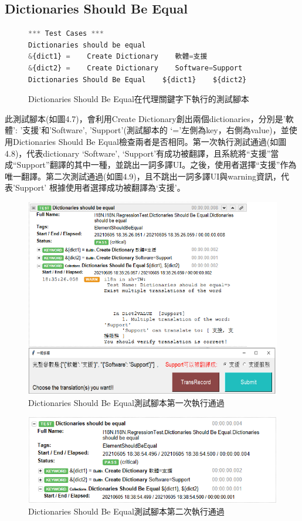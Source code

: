 \subsection{Dictionaries Should Be Equal}
\begin{figure}[H]
\begin{lstlisting}[language={python}]
*** Test Cases ***
Dictionaries should be equal
&{dict1} =    Create Dictionary    軟體=支援
&{dict2} =    Create Dictionary    Software=Support
Dictionaries Should Be Equal    ${dict1}    ${dict2}
\end{lstlisting}
\caption{Dictionaries Should Be Equal在代理關鍵字下執行的測試腳本}
\end{figure}
此測試腳本(如圖4.7)，會利用Create Dictionary創出兩個dictionaries，分別是{'軟體': '支援'}和{'Software', 'Support'}(測試腳本的 ‘=’左側為key，右側為value)，並使用Dictionaries Should Be Equal檢查兩者是否相同。第一次執行測試通過(如圖4.8)，代表dictionary {‘Software’, ‘Support’}有成功被翻譯，且系統將“支援”當成“Support”翻譯的其中一種，並跳出一詞多譯UI。之後，使用者選擇“支援”作為唯一翻譯。第二次測試通過(如圖4.9)，且不跳出一詞多譯UI與warning資訊，代表’Support’ 根據使用者選擇成功被翻譯為‘支援’。

\begin{figure}[H]
\includegraphics[width= \textwidth]{../論文截圖/4.1.3-2 dictionaries should be equal 1st run.png}
\caption{Dictionaries Should Be Equal測試腳本第一次執行通過}
\end{figure}

\begin{figure}[H]
\includegraphics[width= \textwidth]{../論文截圖/4.1.3-3 dictionaries should be equal 2nd run.png}
\caption{Dictionaries Should Be Equal測試腳本第二次執行通過}
\end{figure}

